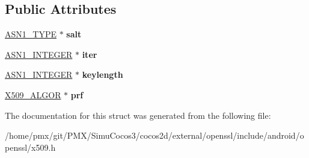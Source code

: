 \subsection*{Public Attributes}
\begin{DoxyCompactItemize}
\item 
\mbox{\label{structPBKDF2PARAM__st_aa9e4479cd9de9ed86da43064cab0bb65}} 
\hyperlink{structasn1__type__st}{A\+S\+N1\+\_\+\+T\+Y\+PE} $\ast$ {\bfseries salt}
\item 
\mbox{\label{structPBKDF2PARAM__st_a9430a0857f02bb61cbd20376a306033f}} 
\hyperlink{structasn1__string__st}{A\+S\+N1\+\_\+\+I\+N\+T\+E\+G\+ER} $\ast$ {\bfseries iter}
\item 
\mbox{\label{structPBKDF2PARAM__st_acf52286e952e0064cf03120ece3c663f}} 
\hyperlink{structasn1__string__st}{A\+S\+N1\+\_\+\+I\+N\+T\+E\+G\+ER} $\ast$ {\bfseries keylength}
\item 
\mbox{\label{structPBKDF2PARAM__st_aa73fd9e106d5cfbe9e631b4dbbbdc90e}} 
\hyperlink{structX509__algor__st}{X509\+\_\+\+A\+L\+G\+OR} $\ast$ {\bfseries prf}
\end{DoxyCompactItemize}


The documentation for this struct was generated from the following file\+:\begin{DoxyCompactItemize}
\item 
/home/pmx/git/\+P\+M\+X/\+Simu\+Cocos3/cocos2d/external/openssl/include/android/openssl/x509.\+h\end{DoxyCompactItemize}
